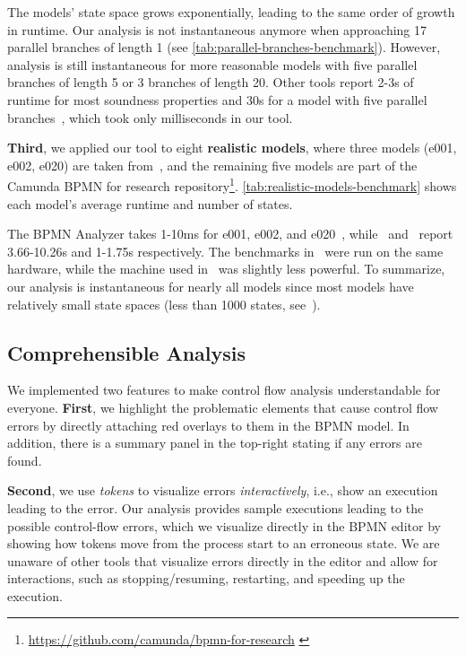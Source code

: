 \documentclass[
onecolumn, %
]{ceurart}
\begin{document}
The models' state space grows exponentially, leading to the same order of growth in runtime.
Our analysis is not instantaneous anymore when approaching 17 parallel branches of length 1 (see \autoref{tab:parallel-branches-benchmark}).
However, analysis is still instantaneous for more reasonable models with five parallel branches of length 5 or 3 branches of length 20.
Other tools report 2-3s of runtime for most soundness properties and 30s for a model with five parallel branches~\cite{corradiniFormalApproachAnalysis2021}, which took only milliseconds in our tool.

\textbf{Third}, we applied our tool to eight \textbf{realistic models}, where three models (e001, e002, e020) are taken from~\cite{houhouFirstOrderLogicVerification2022}, and the remaining five models are part of the Camunda BPMN for research repository\footnote{\url{https://github.com/camunda/bpmn-for-research} \label{footnote:camundaResearch}}.
\autoref{tab:realistic-models-benchmark} shows each model's average runtime and number of states.

The BPMN Analyzer takes 1-10ms for e001, e002, and e020~\cite{krauterInstantaneousComprehensibleFixable2024}, while~\cite{houhouFirstOrderLogicVerification2022} and~\cite{krauterFormalizationAnalysisBPMN2023} report 3.66-10.26s and 1-1.75s respectively.
The benchmarks in~\cite{krauterFormalizationAnalysisBPMN2023} were run on the same hardware, while the machine used in~\cite{houhouFirstOrderLogicVerification2022} was slightly less powerful.
To summarize, our analysis is instantaneous for nearly all models since most models have relatively small state spaces (less than 1000 states, see~\cite{fahlandAnalysisDemandInstantaneous2011}).

\subsection{Comprehensible Analysis}
We implemented two features to make control flow analysis understandable for everyone. 
\textbf{First}, we highlight the problematic elements that cause control flow errors by directly attaching red overlays to them in the BPMN model.
In addition, there is a summary panel in the top-right stating if any errors are found.

\textbf{Second}, we use \textit{tokens} to visualize errors \textit{interactively}, i.e., show an execution leading to the error.
Our analysis provides sample executions leading to the possible control-flow errors, which we visualize directly in the BPMN editor by showing how tokens move from the process start to an erroneous state.
We are unaware of other tools that visualize errors directly in the editor and allow for interactions, such as stopping/resuming, restarting, and speeding up the execution.
\end{document}
